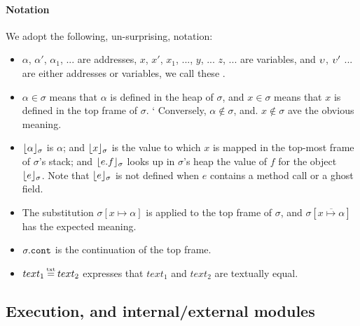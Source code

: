 \paragraph{Notation} We adopt the following, un-surprising, notation:
\begin{itemize}
\item
$\alpha$, $\alpha'$, $\alpha_1$, ... are addresses,   $x$, $x'$, $x_1$, ..., $y$, ... $z$, ... are variables, and $\upsilon$, $\upsilon'$ ... are either addresses or variables, we call these \emph{\atoms}.
\item
$\alpha \in \sigma$ means that $\alpha$ is defined in the heap of $\sigma$, and $x\in \sigma$ means that $x$ is defined in the top frame of $\sigma$.
`%
Conversely, %
 $\alpha\notin\sigma$, and. $x\notin\sigma$ %
 ave the obvious meaning.
\item
$\lfloor \alpha \rfloor_{\sigma}$  is $\alpha$; and $\lfloor x \rfloor_{\sigma}$  is the value to which  $x$  is mapped in the top-most frame of $\sigma$'s stack; 
and $\lfloor e.f \rfloor_{\sigma}$ looks up in $\sigma$'s heap the value of $f$ for the object  $\lfloor e \rfloor_{\sigma}$.
Note that $\lfloor e \rfloor_{\sigma}$ is not defined when $e$ contains a method call or a ghost field.
\item The substitution  $\sigma[x \mapsto \alpha]$ is applied to the top frame of $\sigma$, and $\sigma[\overline{x \mapsto \alpha}]$ %
has the expected meaning.
\item
$\sigma.{\texttt{cont}}$ is the continuation of the top frame.
\item
$text_1 \txteq text_2$ expresses that $text_1$ and $text_2$ are textually equal.
\end{itemize}

  

  
\subsection{\LangOO Execution, and internal/external modules }
\label{sect:execution}

